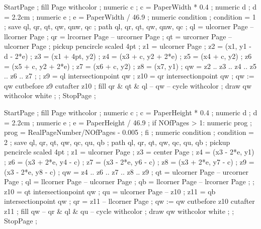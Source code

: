 
\NormalHeight        {\textheight}
\PictureFrameHeight  {\textheight}




\setupcolors[textcolor=simpleslides:textcolor]


StartPage ;
fill Page withcolor  ;
numeric c ; c = PaperWidth * 0.4 ;
numeric d ; d = 2.2cm ;
numeric e ; e = PaperWidth / 46.9 ;
numeric condition ; condition = 1 ;
save ql, qr, qt, qw, qnw, qc ; path ql, qr, qt, qw, qnw, qc ;
ql = ulcorner Page -- llcorner Page ;
qr = lrcorner Page -- urcorner Page ;
qt = urcorner Page -- ulcorner Page ;
pickup pencircle scaled 4pt ;
z1 = ulcorner Page ;
z2 = (x1, y1 - d - 2*e) ;
z3 = (x1 + 4pt, y2) ;
z4 = (x3 + c, y2 + 2*e) ;
z5 = (x4 + c, y2) ;
z6 = (x5 + c, y2 + 2*e) ;
z7 = (x6 + c, y2) ;
z8 = (x7, y1) ;
qw = z2 .. z3 .. z4 .. z5 .. z6 .. z7 ;
 ;
z9 = ql intersectionpoint qw ;
z10 = qr intersectionpoint qw ;
qw := qw cutbefore z9 cutafter z10 ;
fill qr & qt & ql -- qw -- cycle withcolor  ;
draw qw withcolor white ;
 ;
StopPage ;
\stopuseMPgraphic

StartPage ;
fill Page withcolor  ;
numeric c ; c = PaperHeight * 0.4 ;
numeric d ; d = 2.2cm ;
numeric e ; e = PaperHeight / 46.9 ;
if NOfPages > 1:
  numeric prog ; prog = RealPageNumber/NOfPages - 0.005 ;
fi ;
numeric condition ; condition = 2 ;
save ql, qr, qt, qw, qc, qu, qb ; path ql, qr, qt, qw, qc, qu, qb ;
pickup pencircle scaled 4pt ;
z1 = ulcorner Page ;
z3 = center Page ;
z4 = (x3 - 2*e, y1) ;
z6 = (x3 + 2*e, y4 - c) ;
z7 = (x3 - 2*e, y6 - c) ;
z8 = (x3 + 2*e, y7 - c) ;
z9 = (x3 - 2*e, y8 - c) ;
qw = z4 .. z6 .. z7 .. z8 .. z9 ;
qt = ulcorner Page -- urcorner Page ;
ql = llcorner Page -- ulcorner Page ;
qb = llcorner Page -- lrcorner Page ;
 ;
z10 = qt intersectionpoint qw ;
qu = ulcorner Page -- z10 ;
z11 = qb intersectionpoint qw ;
qr = z11 -- llcorner Page ;
qw := qw cutbefore z10 cutafter z11 ;
fill qw -- qr & ql & qu -- cycle withcolor  ;
draw qw withcolor white ;
 ;
StopPage ;
\stopuseMPgraphic

